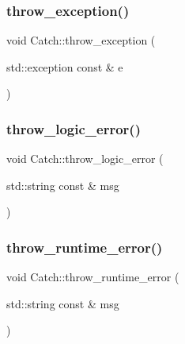\mbox{\label{namespace_catch_a3cbceeab9252d1b752f66a2826e92548}} 
\subsubsection{\texorpdfstring{throw\+\_\+exception()}{throw\_exception()}}
{\footnotesize\ttfamily void Catch\+::throw\+\_\+exception (\begin{DoxyParamCaption}\item[{std\+::exception const \&}]{e }\end{DoxyParamCaption})}

\mbox{\label{namespace_catch_a707884e681203fef6bf7dbf752532fa5}} 
\subsubsection{\texorpdfstring{throw\+\_\+logic\+\_\+error()}{throw\_logic\_error()}}
{\footnotesize\ttfamily void Catch\+::throw\+\_\+logic\+\_\+error (\begin{DoxyParamCaption}\item[{std\+::string const \&}]{msg }\end{DoxyParamCaption})}

\mbox{\label{namespace_catch_a48d2c35022dd9d56a1b7ee78ad581eea}} 
\subsubsection{\texorpdfstring{throw\+\_\+runtime\+\_\+error()}{throw\_runtime\_error()}}
{\footnotesize\ttfamily void Catch\+::throw\+\_\+runtime\+\_\+error (\begin{DoxyParamCaption}\item[{std\+::string const \&}]{msg }\end{DoxyParamCaption})}

\mbox{\label{namespace_catch_ac036a17412d318598ffda8e1fe7a1177}} 
